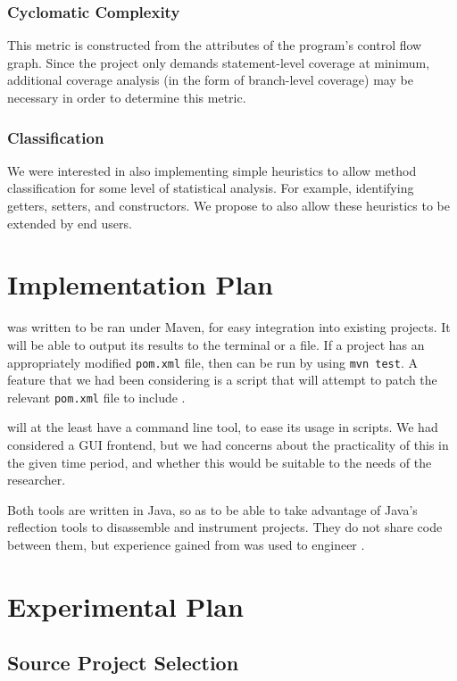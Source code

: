 \subsubsection{Cyclomatic Complexity}

This metric is constructed from the attributes of the program's control flow graph. Since the project only demands statement-level coverage at minimum, additional coverage analysis (in the form of branch-level coverage) may be necessary in order to determine this metric.

\subsubsection{Classification}

We were interested in also implementing simple heuristics to allow method classification for some level of statistical analysis. For example, identifying getters, setters, and constructors. We propose to also allow these heuristics to be extended by end users.

\section{Implementation Plan}
\ct{} was written to be ran under Maven, for easy integration into existing projects. It will be able to output its results to the terminal or a file. If a project has an appropriately modified \texttt{pom.xml} file, then \ct{} can be run by using \texttt{mvn test}. A feature that we had been considering is a script that will attempt to patch the relevant \texttt{pom.xml} file to include \ct{}.

\mt{} will at the least have a command line tool, to ease its usage in scripts. We had considered a GUI frontend, but we had concerns about the practicality of this in the given time period, and whether this would be suitable to the needs of the researcher.

Both tools are written in Java, so as to be able to take advantage of Java's reflection tools to disassemble and instrument projects. They do not share code between them, but experience gained from \ct{} was used to engineer \mt{}.

\section{Experimental Plan}

\subsection{Source Project Selection}

